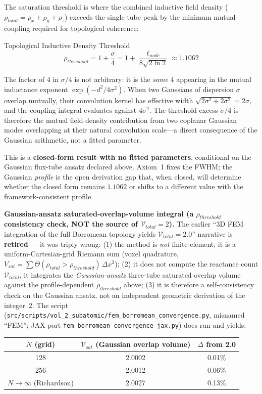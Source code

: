The saturation threshold is where the combined inductive field density ($\rho_{total} = \rho_x + \rho_y + \rho_z$) exceeds the single-tube peak by the minimum mutual coupling required for topological coherence:
\begin{resultbox}{Topological Inductive Density Threshold}
\begin{equation}
    \rho_{threshold} = 1 + \frac{\sigma}{4} = 1 + \frac{\ell_{node}}{8\sqrt{2\ln 2}} \approx 1.1062
\end{equation}
\end{resultbox}
The factor of 4 in $\sigma/4$ is not arbitrary: it is the \textit{same} 4 appearing in the mutual inductance exponent $\exp(-d^2/4\sigma^2)$. When two Gaussians of dispersion $\sigma$ overlap mutually, their convolution kernel has effective width $\sqrt{2\sigma^2 + 2\sigma^2} = 2\sigma$, and the coupling integral evaluates against $4\sigma^2$. The threshold excess $\sigma/4$ is therefore the mutual field density contribution from two coplanar Gaussian modes overlapping at their natural convolution scale---a direct consequence of the Gaussian arithmetic, not a fitted parameter.

This is a \textbf{closed-form result with no fitted parameters}, conditional on the Gaussian flux-tube ansatz declared above. Axiom~1 fixes the FWHM; the Gaussian \emph{profile} is the open derivation gap that, when closed, will determine whether the closed form remains $1.1062$ or shifts to a different value with the framework-consistent profile.

\textbf{Gaussian-ansatz saturated-overlap-volume integral (a $\rho_{threshold}$ consistency check, NOT the source of $\mathcal{V}_{total} = 2$).} The earlier ``3D FEM integration of the full Borromean topology yields $\mathcal{V}_{total} = 2.0$'' narrative is \textbf{retired} --- it was triply wrong: (1) the method is \emph{not} finite-element, it is a uniform-Cartesian-grid Riemann sum (voxel quadrature, $V_{sat} = \sum \Theta(\rho_{total} > \rho_{threshold})\,\Delta x^3$); (2) it does not compute the reactance count $\mathcal{V}_{total}$, it integrates the \emph{Gaussian-ansatz} three-tube saturated overlap volume against the profile-dependent $\rho_{threshold}$ above; (3) it is therefore a self-consistency check on the Gaussian ansatz, not an independent geometric derivation of the integer~2. The script (\texttt{src/scripts/vol\_2\_subatomic/fem\_borromean\_convergence.py}, misnamed ``FEM''; JAX port \texttt{fem\_borromean\_convergence\_jax.py}) does run and yields:
\begin{center}
\begin{tabular}{ccc}
\hline
$N$ (grid) & $\mathcal{V}_{sat}$ (Gaussian overlap volume) & $\Delta$ from 2.0 \\ \hline
128 & 2.0002 & 0.01\% \\
256 & 2.0012 & 0.06\% \\
$N\to\infty$ (Richardson) & 2.0027 & 0.13\% \\ \hline
\end{tabular}
\end{center}

